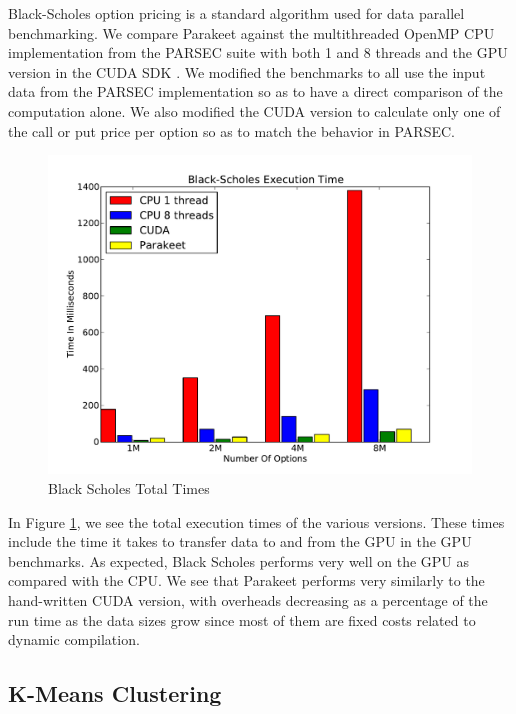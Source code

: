\documentclass[10pt,twocolumn]{article}
\begin{document}
Black-Scholes option pricing \cite{Blac73} is a standard algorithm used for data parallel benchmarking.  We compare Parakeet against the multithreaded OpenMP CPU implementation from the PARSEC \cite{Bien08} suite with both 1 and 8 threads and the GPU version in the CUDA SDK \cite{NvidSD}.  We modified the benchmarks to all use the input data from the PARSEC implementation so as to have a direct comparison of the computation alone.  We also modified the CUDA version to calculate only one of the call or put price per option so as to match the behavior in PARSEC.

\begin{figure}[h!]
\includegraphics[scale=0.4]{BSWCPU.pdf}
\caption{Black Scholes Total Times}
\label{BSCPU}
\end{figure}

In Figure \ref{BSCPU}, we see the total execution times of the various versions. These times include the time it takes to transfer data to and from the GPU in the GPU benchmarks.  As expected, Black Scholes performs very well on the GPU as compared with the CPU.  We see that Parakeet performs very similarly to the hand-written CUDA version, with overheads decreasing as a percentage of the run time as the data sizes grow since most of them are fixed costs related to dynamic compilation.

\subsection{K-Means Clustering}
\label{results-k-means}
\end{document}
